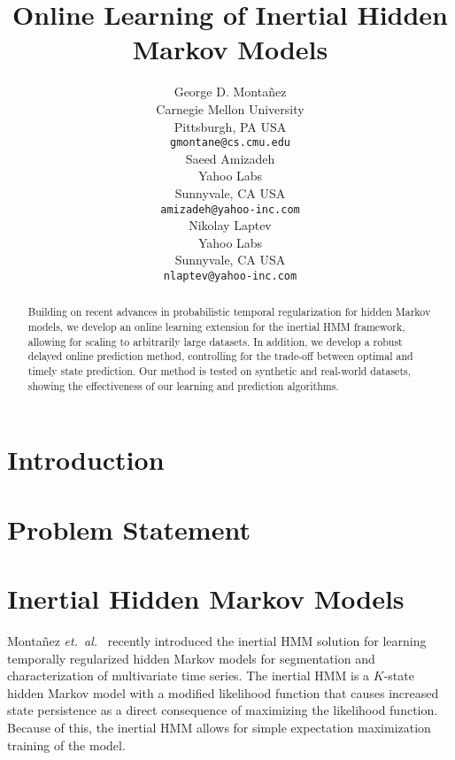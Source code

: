 \documentclass{article}
\title{Online Learning of Inertial Hidden Markov Models}
\author{George D. Monta\~nez \\
Carnegie Mellon University\\
Pittsburgh, PA USA\\
\texttt{gmontane@cs.cmu.edu} \\
\And
Saeed Amizadeh\\
Yahoo Labs\\
Sunnyvale, CA USA\\
\texttt{amizadeh@yahoo-inc.com}\\
\And
Nikolay Laptev\\
Yahoo Labs\\
Sunnyvale, CA USA\\
\texttt{nlaptev@yahoo-inc.com}}
\begin{document}
\maketitle

\begin{abstract}
Building on recent advances in probabilistic temporal regularization for hidden Markov models, we develop an online learning extension for the inertial HMM framework, allowing for scaling to arbitrarily large datasets. In addition, we develop a robust delayed online prediction method, controlling for the trade-off between optimal and timely state prediction. Our method is tested on synthetic and real-world datasets, showing the effectiveness of our learning and prediction algorithms.
\end{abstract}

\section{Introduction}

\section{Problem Statement}

\section{Inertial Hidden Markov Models}

Monta\~nez \emph{et.\ al.}~ recently introduced the inertial HMM solution for learning temporally regularized hidden Markov models for segmentation and characterization of multivariate time series. The inertial HMM is a $K$-state hidden Markov model with a modified likelihood function that causes increased state persistence as a direct consequence of maximizing the likelihood function. Because of this, the inertial HMM allows for simple expectation maximization~\cite{dempster1977maximum} training of the model.
\end{document}
